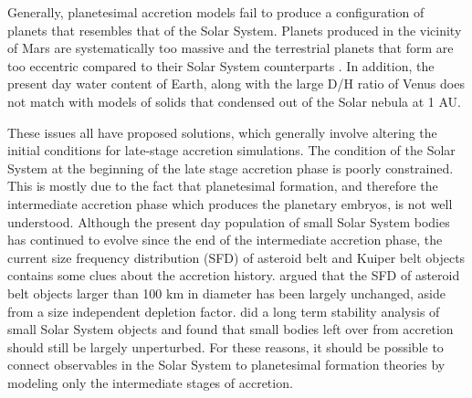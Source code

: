 Generally, planetesimal accretion models fail to produce a configuration of planets that resembles that of the Solar System. 
Planets produced in the vicinity of Mars are systematically too massive \cite{wetherill92, raymond09, morishima10, izidoro15} 
and the terrestrial planets that form are too eccentric compared to their Solar System counterparts 
\cite{chambers98, agnor99, chambers01}. In addition, the present day water content of Earth, along with the large D/H ratio of 
Venus \cite{donahue82} does not match with models of solids that condensed out of the Solar nebula at 1 AU.

These issues all have proposed solutions, which generally involve altering the initial conditions for late-stage
accretion simulations. The condition of the Solar System at the beginning of the late stage accretion phase is poorly constrained. 
This is mostly due to the fact that planetesimal formation, and therefore the intermediate accretion phase which produces the 
planetary embryos, is not well understood. Although the present day population of small Solar System bodies has continued to 
evolve since the end of the intermediate accretion phase, the current size frequency distribution (SFD) of asteroid belt and 
Kuiper belt objects contains some clues about the accretion history. \cite{morbidelli09} argued that the SFD of asteroid belt 
objects larger than 100 km in diameter has been largely unchanged, aside from a size independent depletion factor. 
\cite{duncan89} did a long term stability analysis of small Solar System objects and found that small bodies left over from 
accretion should still be largely unperturbed. For these reasons, it should be possible to connect observables in the Solar System to planetesimal formation theories by modeling only the intermediate stages of accretion.

